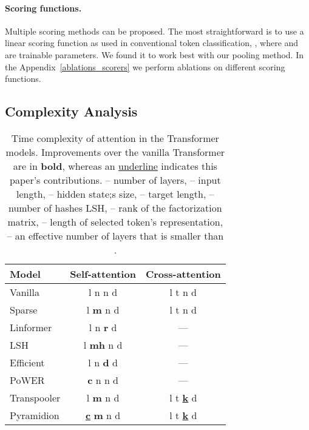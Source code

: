 \documentclass{article}
\begin{document}
\paragraph{Scoring functions.\label{sec:scoring}} 
Multiple scoring methods can be proposed. The most straightforward is to use a linear scoring function as used in conventional token classification, , where  and  are trainable parameters. We found it to work best with our pooling method. In the Appendix~\ref{ablations_scorers} we perform ablations on different scoring functions.



\subsection{Complexity Analysis}

\begin{table}
    \centering
    \caption{
        Time complexity of attention in the Transformer models. Improvements over the vanilla Transformer are in \textbf{bold}, whereas an \underline{underline} indicates this paper's contributions.
         -- number of layers,  -- input length,  -- hidden state;s size,  -- target length,  -- number of hashes LSH,  -- rank of the factorization matrix,  -- length of selected token's representation,  -- an effective number of layers that is smaller than .
        }
        \label{complexity}
        \centering
        \begin{tabular}{lcc}
        \toprule
        Model & Self-attention & Cross-attention \\ \midrule
        Vanilla  & l  n  n  d & l  t  n  d \\     Sparse& l  \textbf{m}  n  d & l  t  n  d \\
        Linformer  & l  n  \textbf{r}  d & --- \\
LSH & l  \textbf{mh}  n  d &  --- \\
        Efficient & l  n  \textbf{d}  d & --- \\
        PoWER & \textbf{c}  n  n  d  & --- \\
        \midrule
        Transpooler & l  \textbf{m}   n  d 
            & l  t  \textbf{\underline{k}}  d \\
        Pyramidion & \textbf{\underline{c}}  \textbf{m}  n  d 
            & l  t  \textbf{\underline{k}}  d \\
         \bottomrule
         \end{tabular}
\end{table}
\end{document}
